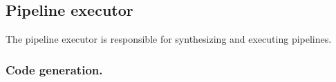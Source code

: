 \documentclass[runningheads]{llncs}
\begin{document}




\subsection{Pipeline executor}
\label{subsec:pipeline-execution}
The pipeline executor is responsible for synthesizing and executing pipelines.

\subsubsection{Code generation.}

\end{document}
